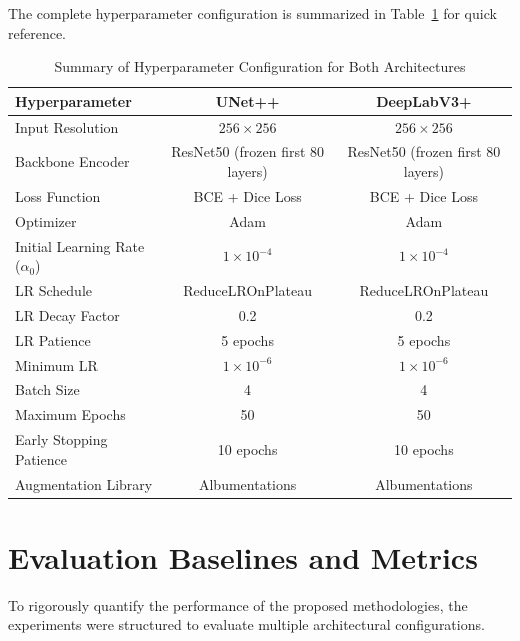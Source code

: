 The complete hyperparameter configuration is summarized in Table~\ref{tab:hyperparameters} for quick reference.

\begin{table}[H]
\centering
\caption{Summary of Hyperparameter Configuration for Both Architectures}
\label{tab:hyperparameters}
\begin{tabular}{@{}lcc@{}}
\toprule
\textbf{Hyperparameter} & \textbf{UNet++} & \textbf{DeepLabV3+} \\ \midrule
Input Resolution & $256 \times 256$ & $256 \times 256$ \\
Backbone Encoder & ResNet50 (frozen first 80 layers) & ResNet50 (frozen first 80 layers) \\
Loss Function & BCE + Dice Loss & BCE + Dice Loss \\
Optimizer & Adam & Adam \\
Initial Learning Rate ($\alpha_0$) & $1 \times 10^{-4}$ & $1 \times 10^{-4}$ \\
LR Schedule & ReduceLROnPlateau & ReduceLROnPlateau \\
LR Decay Factor & 0.2 & 0.2 \\
LR Patience & 5 epochs & 5 epochs \\
Minimum LR & $1 \times 10^{-6}$ & $1 \times 10^{-6}$ \\
Batch Size & 4 & 4 \\
Maximum Epochs & 50 & 50 \\
Early Stopping Patience & 10 epochs & 10 epochs \\
Augmentation Library & Albumentations & Albumentations \\
\bottomrule
\end{tabular}
\end{table}


\section{Evaluation Baselines and Metrics}
To rigorously quantify the performance of the proposed methodologies, the experiments were structured to evaluate multiple architectural configurations.

